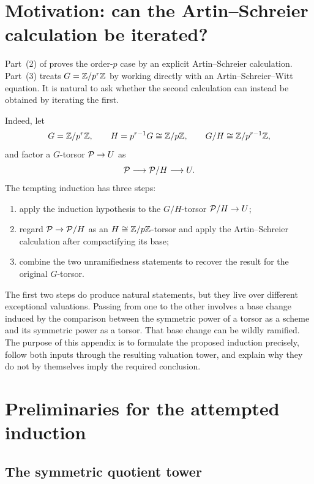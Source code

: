 \section{Motivation: can the Artin--Schreier calculation be iterated?}
\label{sec:as_induction_motivation}

Part~(2) of  proves the order-$p$
case by an explicit Artin--Schreier calculation. Part~(3) treats
$G=\mathbb{Z}/p^r\mathbb{Z}$ by working directly with an Artin--Schreier--Witt equation.
It is natural to ask whether the second calculation can instead be obtained
by iterating the first.

Indeed, let
\[
G=\mathbb{Z}/p^r\mathbb{Z},\qquad
H=p^{r-1}G\cong\mathbb{Z}/p\mathbb{Z},\qquad
G/H\cong\mathbb{Z}/p^{r-1}\mathbb{Z},
\]
and factor a $G$-torsor $\mathcal{P}\to U$ as
\[
\mathcal{P}\longrightarrow\mathcal{P}/H\longrightarrow U.
\]
The tempting induction has three steps:
\begin{enumerate}
  \item apply the induction hypothesis to the $G/H$-torsor
        $\mathcal{P}/H\to U$;
  \item regard $\mathcal{P}\to\mathcal{P}/H$ as an $H\cong\mathbb{Z}/p\mathbb{Z}$-torsor and apply the
        Artin--Schreier calculation after compactifying its base;
  \item combine the two unramifiedness statements to recover the result for
        the original $G$-torsor.
\end{enumerate}

The first two steps do produce natural statements, but they live over
different exceptional valuations. Passing from one to the other involves a
base change induced by the comparison between the symmetric power of a
torsor as a scheme and its symmetric power as a torsor. That base change can
be wildly ramified. The purpose of this appendix is to formulate the proposed
induction precisely, follow both inputs through the resulting valuation
tower, and explain why they do not by themselves imply the required
conclusion.


\section{Preliminaries for the attempted induction}
\label{sec:as_induction_preliminaries}

\subsection{The symmetric quotient tower}
\label{subsection:quotient_torsors_towers}

